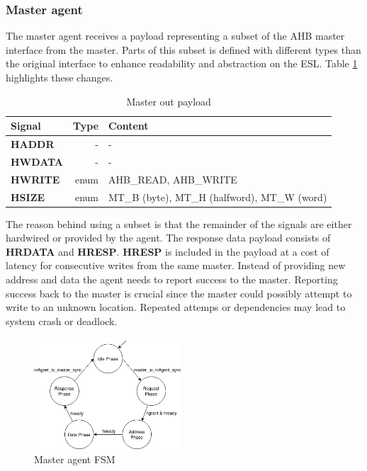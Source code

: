 \subsubsection{Master agent}
The master agent receives a payload representing a subset of the AHB master interface from the master. Parts of this subset is defined with different types than the original interface to enhance readability and abstraction on the ESL. Table \ref{tab:mpayload} highlights these changes. 
\begin{table}[hbt] 
  \label{tab:mpayload}
  \begin{tabular}{|p{25mm}|r|p{10cm}|} 
  \hline
  \textbf{Signal} & \textbf{Type} & \textbf{Content} \\
    \hline
  \textbf{HADDR} & - & - \\
    \hline
  \textbf{HWDATA} & - & - \\
    \hline
  \textbf{HWRITE} & enum & AHB\_READ, AHB\_WRITE \\
    \hline  
\textbf{HSIZE} & enum & MT\_B (byte), MT\_H (halfword), MT\_W (word) \\
    \hline
  \end{tabular}
\caption{Master out payload}
\end{table}

The reason behind using a subset is that the remainder of the signals are either hardwired or provided by the agent. The response data payload consists of \textbf{HRDATA} and \textbf{HRESP}. \textbf{HRESP} is included in the payload at a cost of latency for consecutive writes from the same master. Instead of providing new address and data the agent needs to report success to the master. Reporting success back to the master is crucial since the master could possibly attempt to write to an unknown location. Repeated attemps or dependencies may lead to system crash or deadlock. 
\newline
\begin{figure}
\includegraphics[width=5.5cm]{figs/hw/mAgent_FSM.png}
\caption{Master agent FSM}\label{fig:rafsm}
\end{figure}  

